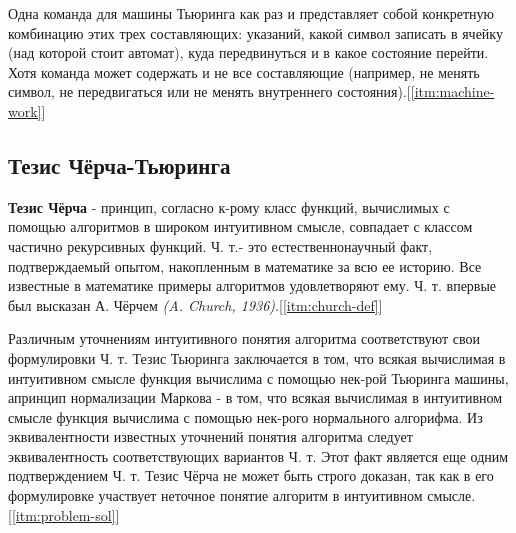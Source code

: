 \documentclass{article}
\begin{document}
Одна команда для машины Тьюринга как раз и представляет собой конкретную комбинацию 
этих трех составляющих: указаний, какой символ записать в ячейку (над которой стоит 
автомат), куда передвинуться и в какое состояние перейти. Хотя команда может содержать
и не все составляющие (например, не менять символ, не передвигаться или не менять 
внутреннего состояния).[\ref{itm:machine-work}]

\subsection{Тезис Чёрча-Тьюринга}
\textbf{Тезис Чёрча} - принцип, согласно к-рому класс функций, вычислимых с помощью алгоритмов 
в широком интуитивном смысле, совпадает с классом частично рекурсивных функций. Ч. т.- 
это естественнонаучный факт, подтверждаемый опытом, накопленным в математике за всю ее
историю. Все известные в математике примеры алгоритмов удовлетворяют ему. Ч. т. впервые
был высказан А. Чёрчем \textit{(A. Church, 1936)}.[\ref{itm:church-def}]

Различным уточнениям интуитивного понятия алгоритма соответствуют свои формулировки 
Ч. т. Тезис Тьюринга заключается в том, что всякая вычислимая в интуитивном смысле 
функция вычислима с помощью нек-рой Тьюринга машины, апринцип нормализации Маркова - 
в том, что всякая вычислимая в интуитивном смысле функция вычислима с помощью нек-рого 
нормального алгорифма. Из эквивалентности известных уточнений понятия алгоритма следует 
эквивалентность соответствующих вариантов Ч. т. Этот факт является еще одним 
подтверждением Ч. т. Тезис Чёрча не может быть строго доказан, так как в его 
формулировке участвует неточное понятие алгоритм в интуитивном смысле.[\ref{itm:problem-sol}]

\pagebreak
\end{document}
